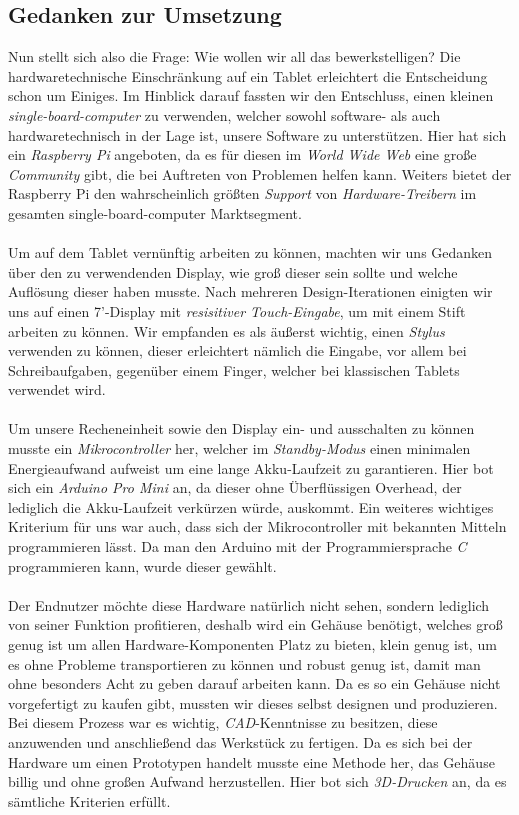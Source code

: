 \subsection{Gedanken zur Umsetzung}
Nun stellt sich also die Frage: Wie wollen wir all das bewerkstelligen? Die hardwaretechnische Einschränkung auf ein Tablet erleichtert die Entscheidung schon um Einiges. Im Hinblick darauf fassten wir den Entschluss, einen kleinen \textit{single-board-computer} zu verwenden, welcher sowohl software- als auch hardwaretechnisch in der Lage ist, unsere Software zu unterstützen. Hier hat sich ein \textit{Raspberry Pi} angeboten, da es für diesen im \textit{World Wide Web} eine große \textit{Community} gibt, die bei Auftreten von Problemen helfen kann. Weiters bietet der Raspberry Pi den wahrscheinlich größten \textit{Support} von \textit{Hardware-Treibern} im gesamten single-board-computer Marktsegment.\\
\\
Um auf dem Tablet vernünftig arbeiten zu können, machten wir uns Gedanken über den zu verwendenden Display, wie groß dieser sein sollte und welche Auflösung dieser haben musste. Nach mehreren Design-Iterationen einigten wir uns auf einen 7'-Display mit \textit{resisitiver Touch-Eingabe}, um mit einem Stift arbeiten zu können. Wir empfanden es als äußerst wichtig, einen \textit{Stylus} verwenden zu können, dieser erleichtert nämlich die Eingabe, vor allem bei Schreibaufgaben, gegenüber einem Finger, welcher bei klassischen Tablets verwendet wird.\\
\\
Um unsere Recheneinheit sowie den Display ein- und ausschalten zu können musste ein \textit{Mikrocontroller} her, welcher im \textit{Standby-Modus} einen minimalen Energieaufwand aufweist um eine lange Akku-Laufzeit zu garantieren. Hier bot sich ein \textit{Arduino Pro Mini} an, da dieser ohne Überflüssigen Overhead, der lediglich die Akku-Laufzeit verkürzen würde, auskommt. Ein weiteres wichtiges Kriterium für uns war auch, dass sich der Mikrocontroller mit bekannten Mitteln programmieren lässt. Da man den Arduino mit der Programmiersprache \textit{C} programmieren kann, wurde dieser gewählt.\\
\\
Der Endnutzer möchte diese Hardware natürlich nicht sehen, sondern lediglich von seiner Funktion profitieren, deshalb wird ein Gehäuse benötigt, welches groß genug ist um allen Hardware-Komponenten Platz zu bieten, klein genug ist, um es ohne Probleme transportieren zu können und robust genug ist, damit man ohne besonders Acht zu geben darauf arbeiten kann. Da es so ein Gehäuse nicht vorgefertigt zu kaufen gibt, mussten wir dieses selbst designen und produzieren. Bei diesem Prozess war es wichtig, \textit{CAD}-Kenntnisse zu besitzen, diese anzuwenden und anschließend das Werkstück zu fertigen. Da es sich bei der Hardware um einen Prototypen handelt musste eine Methode her, das Gehäuse billig und ohne großen Aufwand herzustellen. Hier bot sich \textit{3D-Drucken} an, da es sämtliche Kriterien erfüllt.\\

